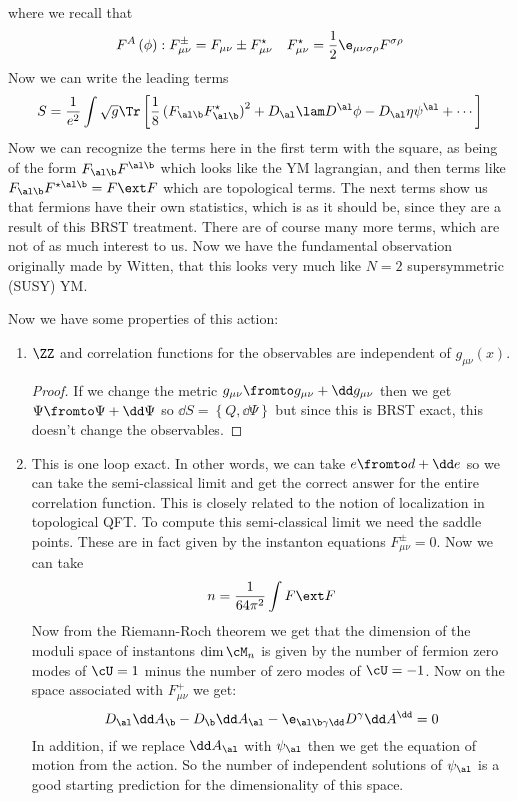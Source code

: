 \documentclass{booc}
\begin{document}
where we recall that
\begin{align}
F^A\left( \phi \right): F_{\mu\nu}^{\pm} = F_{\mu\nu} \pm F_{\mu\nu}^\star
&&
F_{\mu\nu}^\star = \frac{1}{2} \e_{\mu\nu \sigma \rho}F^{\sigma\rho}
\end{align}
Now we can write the leading terms
\begin{equation}
S = \frac{1}{e^2} \int \sqrt{g} \Tr \left[ 
\frac{1}{8} \left( F_{\al \b} F_{\al\b}^\star \right)^2 + 
D_\al \lam D^\al \phi - D_\al \eta \psi^\al + \cdots\right]
\end{equation}
Now we can recognize the terms here in the first term with the square,
as being of the form 
$F_{\al\b}F^{\al\b}$ which looks like the YM lagrangian, and then
terms like $F_{\al\b}F^{\star \al\b} = F\ext F$ which are topological terms.
The next terms show us that fermions have their own statistics, which is as it should be,
since they are a result of this BRST treatment. 
There are of course many more terms, which are not of as much interest to us. 
Now we have the fundamental observation originally made by Witten,
that this looks very much like $N = 2$ supersymmetric (SUSY) YM. 

Now we have some properties of this action:
\begin{enumerate}
\item $\ZZ$ and correlation functions for the observables 
are independent of $g_{\mu\nu}\left( x \right)$.
\begin{proof}
If we change the metric $g_{\mu\nu}\fromto g_{\mu\nu} + \dd g_{\mu\nu}$
then we get $\Psi \fromto \Psi + \dd \Psi$
so $\dd S = \left\{  Q , \dd \Psi \right\}$
but since this is BRST exact, this doesn't change the observables.
\end{proof}
\item This is one loop exact. In other words, we can take $e\fromto d + \dd e$
so we can take the semi-classical limit and get the correct answer for the entire
correlation function.
This is closely related to the notion of localization in topological QFT.
To compute this semi-classical limit we need the saddle points. 
These are in fact given by the instanton equations $F_{\mu\nu}^{\pm}=0$.
Now we can take
\begin{equation}
n = \frac{1}{64 \pi^2} \int F\ext F
\end{equation}
Now from the Riemann-Roch theorem we get that the dimension of the moduli space
of instantons $\dim \cM_n$ is given by the number of fermion zero modes of $\cU = 1$
minus the number of zero modes of $\cU = -1$.
Now on the space associated with $F_{\mu\nu}^+$ we get:
\begin{equation}
D_\al \dd A_\b - D_\b \dd A_\al - \e_{\al\b \gamma\dd} D^\gamma \dd A^\dd =0 
\end{equation}
In addition, if we replace $\dd A_\al$ with $\psi_\al$ then we get the equation of motion
from the action.
So the number of independent solutions of $\psi_\al$ is a good starting prediction for the dimensionality
of this space.
\end{enumerate}
\end{document}
